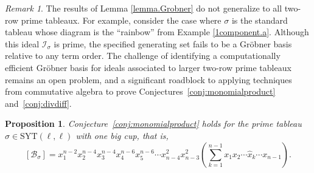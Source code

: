 \documentclass[11pt]{amsart}
\newtheorem{prop}[theorem]{Proposition}
\theoremstyle{remark}
\newtheorem{remark}[theorem]{Remark}
\theoremstyle{remark}
\theoremstyle{definition}
\theoremstyle{definition}
\theoremstyle{definition}
\numberwithin{equation}{section}
\newcommand{\gs}{\sigma}
\newcommand{\cb}{\mathcal{B}}
\newcommand{\ci}{\mathcal{I}}
\newcommand{\SYT}{\mathrm{SYT}}
\begin{document}
\begin{remark} The results of Lemma \ref{lemma.Grobner} do not generalize to all two-row prime tableaux. For example, consider the case where $\sigma$ is the standard tableau whose diagram is the ``rainbow'' from Example \ref{1component.a}. Although this ideal $\ci_\gs$ is prime, the specified generating set fails to be a Gr\"obner basis relative to any term order.  The challenge of identifying a computationally efficient Gr\"obner basis for ideals associated to larger two-row prime tableaux remains an open problem, and a significant roadblock to applying techniques from commutative algebra to prove  Conjectures~\ref{conj:monomialproduct} and~\ref{conj:divdiff}.
\end{remark}



\begin{prop}\label{mononebigcup}
Conjecture~\ref{conj:monomialproduct} holds for the prime tableau $\gs\in \SYT(\ell, \ell)$ with one big cup, that is, 
\[
[\cb_\gs] = x_1^{n-2}x_2^{n-4}x_3^{n-4}x_4^{n-6}x_5^{n-6} \cdots x_{n-4}^2x_{n-3}^2  \left(  \sum_{k=1}^{n-1} x_1x_{2}\cdots \hat{x}_k \cdots x_{n-1} \right)  .
\]
\end{prop}
\end{document}

